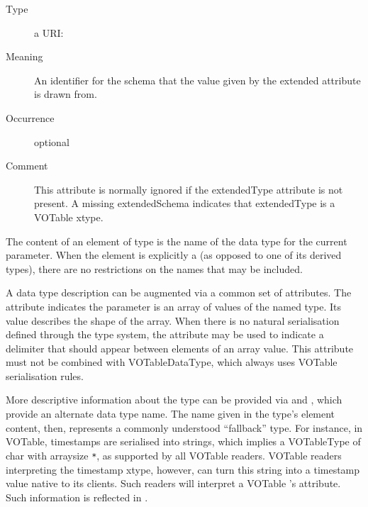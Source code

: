 \documentclass[11pt,a4paper]{ivoa}
\begin{document}
\begin{generated}
\begin{bigdescription}
\begin{description}
\item[Type] a URI: 
\item[Meaning] An identifier for the schema that the value given
                     by the extended attribute is drawn from.
\item[Occurrence] optional
\item[Comment] This attribute is normally ignored if the
                     extendedType attribute is not present.  A missing
                     extendedSchema indicates that extendedType is a
                     VOTable xtype.
\end{description}


\end{bigdescription}\endgroup

\endgroup
\end{generated}


The content of an element of type  is the name
of the data type for the current parameter.  When the element is explicitly
a  (as opposed to one of its derived types),
there are no restrictions on the names that may be included.



A data type description can be augmented via a common set of
 attributes.  The
 attribute indicates the parameter is an array
of values of the named type.  Its value describes the shape of the
array. When there is no natural serialisation defined through the type
system, the  attribute may be used to indicate
a delimiter that should appear between elements of an array value.  This
attribute must not be combined with VOTableDataType, which always
uses VOTable serialisation rules.



More descriptive information about the type can be provided via
 and , which
provide an alternate data type name.  The name
given in the type's element content, then, represents a commonly
understood “fallback” type.  For instance, in VOTable, timestamps are
serialised into strings, which implies a VOTableType of char with
arraysize \verb|*|, as supported by all VOTable readers.  VOTable readers
interpreting the timestamp xtype, however, can turn this string into a
timestamp value native to its clients.  Such readers will interpret
a VOTable 's  attribute.
Such information is reflected in .
\end{document}
